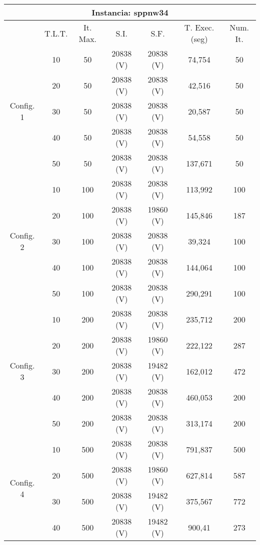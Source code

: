 \begin{table}[htbp]
  
    \begin{tabular}{c|c|c|c|c|c|c}
    \toprule
    \multicolumn{7}{c}{Instancia: sppnw34} \\
    \midrule
          & T.L.T. & It. Max. & S.I.  & S.F.  & T. Exec. (seg) & Num. It. \\
    \hline
	\multirow{5}[8]{*}{Config. 1} & 10    & 50    & 20838 (V) & 20838 (V) & 74,754 & 50 \\
          & 20    & 50    & 20838 (V) & 20838 (V) & 42,516 & 50 \\
          & 30    & 50    & 20838 (V) & 20838 (V) & 20,587 & 50 \\
          & 40    & 50    & 20838 (V) & 20838 (V) & 54,558 & 50 \\
          & 50    & 50    & 20838 (V) & 20838 (V) & 137,671 & 50 \\
    \hline
	\multirow{5}[8]{*}{Config. 2} & 10    & 100   & 20838 (V) & 20838 (V) & 113,992 & 100 \\
          & 20    & 100   & 20838 (V) & 19860 (V) & 145,846 & 187 \\
          & 30    & 100   & 20838 (V) & 20838 (V) & 39,324 & 100 \\
          & 40    & 100   & 20838 (V) & 20838 (V) & 144,064 & 100 \\
          & 50    & 100   & 20838 (V) & 20838 (V) & 290,291 & 100 \\
    \hline
	\multirow{5}[8]{*}{Config. 3} & 10    & 200   & 20838 (V) & 20838 (V) & 235,712 & 200 \\
          & 20    & 200   & 20838 (V) & 19860 (V) & 222,122 & 287 \\
          & 30    & 200   & 20838 (V) & 19482 (V) & 162,012 & 472 \\
          & 40    & 200   & 20838 (V) & 20838 (V) & 460,053 & 200 \\
          & 50    & 200   & 20838 (V) & 20838 (V) & 313,174 & 200 \\
    \hline
	\multirow{5}[8]{*}{Config. 4} & 10    & 500   & 20838 (V) & 20838 (V) & 791,837 & 500 \\
          & 20    & 500   & 20838 (V) & 19860 (V) & 627,814 & 587 \\
          & 30    & 500   & 20838 (V) & 19482 (V) & 375,567 & 772 \\
          & 40    & 500   & 20838 (V) & 19482 (V) & 900,41 & 273 \\

\end{tabular}
\end{table}
